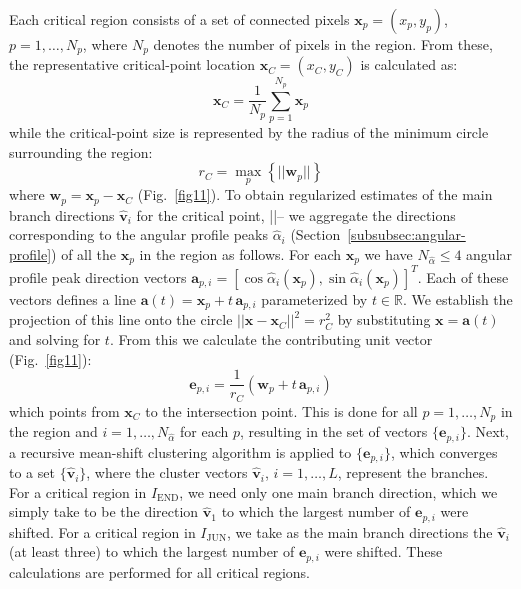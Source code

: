 Each critical region consists of a set of connected pixels $\mathbf{x}_p=(x_p,y_p)$, $p=1,\dots,N_p$, where $N_p$ denotes the number of pixels in the region. From these, the representative critical-point location $\mathbf{x}_C=(x_C,y_C)$ is calculated as:
\begin{equation}
\mathbf{x}_C=\frac{1}{N_p}\sum_{p=1}^{N_p}\mathbf{x}_p
\end{equation}
while the critical-point size is represented by the radius of the minimum circle surrounding the region:
\begin{equation}
r_C = \max_{p}\left\{||\mathbf{w}_p||\right\}
\end{equation}
where $\mathbf{w}_p=\mathbf{x}_p-\mathbf{x}_C$ (Fig.~\ref{fig11}). To obtain regularized estimates of the main branch directions $\hat{\mathbf{v}}_i$ for the critical point, ||-- we aggregate the directions corresponding to the angular profile peaks $\hat{\alpha}_i$ (Section~\ref{subsubsec:angular-profile}) of all the $\mathbf{x}_p$ in the region as follows. For each $\mathbf{x}_p$ we have $N_{\hat{\alpha}}\leq4$ angular profile peak direction vectors $\mathbf{a}_{p,i}=[\cos\hat{\alpha}_i(\mathbf{x}_p),\sin\hat{\alpha}_i(\mathbf{x}_p)]^T$. Each of these vectors defines a line $\mathbf{a}(t)=\mathbf{x}_{p}+t\,\mathbf{a}_{p,i}$ parameterized by $t\in\mathbb{R}$. We establish the projection of this line onto the circle $||\mathbf{x}-\mathbf{x}_C||^2=r^2_C$ by substituting $\mathbf{x}=\mathbf{a}(t)$ and solving for $t$. From this we calculate the contributing unit vector (Fig.~\ref{fig11}):
\begin{equation}
\mathbf{e}_{p,i}=\frac{1}{r_C}(\mathbf{w}_{p}+t\,\mathbf{a}_{p,i})
\end{equation}
which points from $\mathbf{x}_C$ to the intersection point. This is done for all $p=1,\dots,N_p$ in the region and $i=1,\dots,N_{\hat{\alpha}}$ for each $p$, resulting in the set of vectors $\{\mathbf{e}_{p,i}\}$. Next, a recursive mean-shift clustering algorithm \cite{cheng1995mean} is applied to $\{\mathbf{e}_{p,i}\}$, which converges to a set $\{\hat{\mathbf{v}}_{i}\}$, where the cluster vectors $\hat{\mathbf{v}}_{i}$, $i=1,\dots,L$, represent the branches. For a critical region in $I_{\textrm{END}}$, we need only one main branch direction, which we simply take to be the direction $\hat{\mathbf{v}}_1$ to which the largest number of $\mathbf{e}_{p,i}$ were shifted. For a critical region in $I_{\textrm{JUN}}$, we take as the main branch directions the $\hat{\mathbf{v}}_i$ (at least three) to which the largest number of $\mathbf{e}_{p,i}$ were shifted. These calculations are performed for all critical regions.

